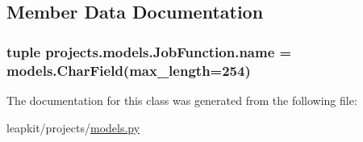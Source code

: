 \subsection{Member Data Documentation}
\hypertarget{classprojects_1_1models_1_1_job_function_a78ca9fe71b1d972f4b49535fe7e35be4}{
\subsubsection[{name}]{\setlength{\rightskip}{0pt plus 5cm}tuple projects.\-models.\-Job\-Function.\-name = models.\-Char\-Field(max\-\_\-length=254)\hspace{0.3cm}{\ttfamily [static]}}}\label{classprojects_1_1models_1_1_job_function_a78ca9fe71b1d972f4b49535fe7e35be4}


The documentation for this class was generated from the following file\-:\begin{DoxyCompactItemize}
\item 
leapkit/projects/\hyperlink{projects_2models_8py}{models.\-py}\end{DoxyCompactItemize}
